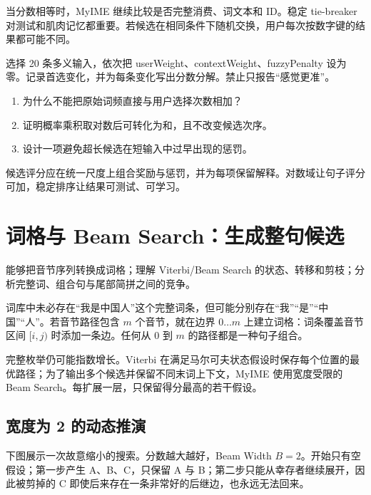 当分数相等时，MyIME 继续比较是否完整消费、词文本和 ID。稳定 tie-breaker 对测试和肌肉记忆都重要。若候选在相同条件下随机交换，用户每次按数字键的结果都可能不同。

\begin{lab}[权重消融]
选择 20 条多义输入，依次把 userWeight、contextWeight、fuzzyPenalty 设为零。记录首选变化，并为每条变化写出分数分解。禁止只报告“感觉更准”。
\end{lab}

\exercises
\begin{enumerate}
  \item 为什么不能把原始词频直接与用户选择次数相加？
  \item 证明概率乘积取对数后可转化为和，且不改变候选次序。
  \item 设计一项避免超长候选在短输入中过早出现的惩罚。
\end{enumerate}

\begin{summarybox}
候选评分应在统一尺度上组合奖励与惩罚，并为每项保留解释。对数域让句子评分可加，稳定排序让结果可测试、可学习。
\end{summarybox}


\chapter{词格与 Beam Search：生成整句候选}

\begin{goals}
能够把音节序列转换成词格；理解 Viterbi/Beam Search 的状态、转移和剪枝；分析完整词、组合句与尾部简拼之间的竞争。
\end{goals}

词库中未必存在“我是中国人”这个完整词条，但可能分别存在“我”“是”“中国”“人”。若音节路径包含 \(m\) 个音节，就在边界 \(0\ldots m\) 上建立词格：词条覆盖音节区间 \([i,j)\) 时添加一条边。任何从 0 到 \(m\) 的路径都是一种句子组合。


完整枚举仍可能指数增长。Viterbi 在满足马尔可夫状态假设时保存每个位置的最优路径；为了输出多个候选并保留不同末词上下文，MyIME 使用宽度受限的 Beam Search。每扩展一层，只保留得分最高的若干假设。

\section{宽度为 2 的动态推演}

下图展示一次故意缩小的搜索。分数越大越好，Beam Width \(B=2\)。开始只有空假设；第一步产生 A、B、C，只保留 A 与 B；第二步只能从幸存者继续展开，因此被剪掉的 C 即使后来存在一条非常好的后继边，也永远无法回来。

